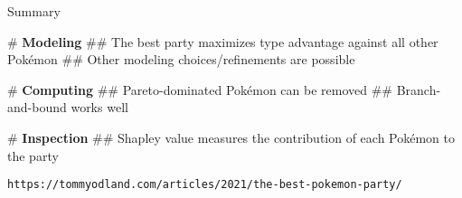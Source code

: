 \documentclass[12pt, aspectratio=149]{beamer}
\newcommand{\listSpace}{0.2em}
\theoremstyle{plain}
\begin{document}
\begin{frame}[fragile]{Summary}
\vspace*{1em}
	\begin{easylist}[itemize]
	# \textbf{Modeling}
	## The best party maximizes type advantage against all other Pokémon
	## Other modeling choices/refinements are possible

	# \textbf{Computing}
	## Pareto-dominated Pokémon can be removed
	## Branch-and-bound works well

	# \textbf{Inspection}
	## Shapley value measures the contribution of each Pokémon to the party
\end{easylist}
\vspace*{1em}
\texttt{https://tommyodland.com/articles/2021/the-best-pokemon-party/}
\end{frame}
\end{document}
